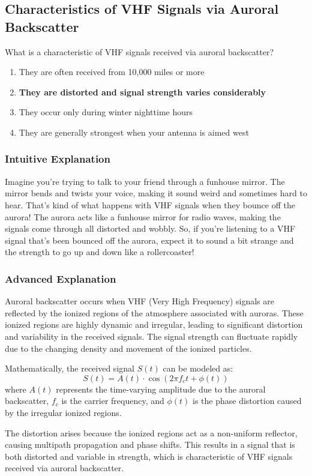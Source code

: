 \subsection{Characteristics of VHF Signals via Auroral Backscatter}
\label{T3C03}

\begin{tcolorbox}[colback=gray!10!white,colframe=black!75!black,title=T3C03]
What is a characteristic of VHF signals received via auroral backscatter?
\begin{enumerate}[label=\Alph*)]
    \item They are often received from 10,000 miles or more
    \item \textbf{They are distorted and signal strength varies considerably}
    \item They occur only during winter nighttime hours
    \item They are generally strongest when your antenna is aimed west
\end{enumerate}
\end{tcolorbox}

\subsubsection{Intuitive Explanation}
Imagine you're trying to talk to your friend through a funhouse mirror. The mirror bends and twists your voice, making it sound weird and sometimes hard to hear. That's kind of what happens with VHF signals when they bounce off the aurora! The aurora acts like a funhouse mirror for radio waves, making the signals come through all distorted and wobbly. So, if you're listening to a VHF signal that's been bounced off the aurora, expect it to sound a bit strange and the strength to go up and down like a rollercoaster!

\subsubsection{Advanced Explanation}
Auroral backscatter occurs when VHF (Very High Frequency) signals are reflected by the ionized regions of the atmosphere associated with auroras. These ionized regions are highly dynamic and irregular, leading to significant distortion and variability in the received signals. The signal strength can fluctuate rapidly due to the changing density and movement of the ionized particles. 

Mathematically, the received signal \( S(t) \) can be modeled as:
\[ S(t) = A(t) \cdot \cos(2\pi f_c t + \phi(t)) \]
where \( A(t) \) represents the time-varying amplitude due to the auroral backscatter, \( f_c \) is the carrier frequency, and \( \phi(t) \) is the phase distortion caused by the irregular ionized regions.

The distortion arises because the ionized regions act as a non-uniform reflector, causing multipath propagation and phase shifts. This results in a signal that is both distorted and variable in strength, which is characteristic of VHF signals received via auroral backscatter.

